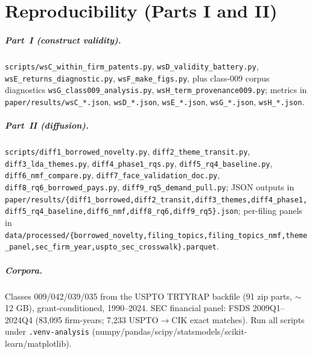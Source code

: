 \documentclass[11pt]{report}
\begin{document}
\chapter*{Reproducibility (Parts I and II)}

\paragraph{Part~I (construct validity).} \texttt{scripts/wsC\_within\_firm\_patents.py},
\texttt{wsD\_validity\_battery.py}, \texttt{wsE\_returns\_diagnostic.py},
\texttt{wsF\_make\_figs.py}, plus class-009 corpus diagnostics
\texttt{wsG\_class009\_analysis.py}, \texttt{wsH\_term\_provenance009.py};
metrics in \texttt{paper/results/wsC\_*.json}, \texttt{wsD\_*.json},
\texttt{wsE\_*.json}, \texttt{wsG\_*.json}, \texttt{wsH\_*.json}.

\paragraph{Part~II (diffusion).} \texttt{scripts/diff1\_borrowed\_novelty.py},
\texttt{diff2\_theme\_transit.py}, \texttt{diff3\_lda\_themes.py},
\texttt{diff4\_phase1\_rqs.py}, \texttt{diff5\_rq4\_baseline.py},
\texttt{diff6\_nmf\_compare.py}, \texttt{diff7\_face\_validation\_doc.py},
\texttt{diff8\_rq6\_borrowed\_pays.py}, \texttt{diff9\_rq5\_demand\_pull.py};
JSON outputs in
\texttt{paper/results/\{diff1\_borrowed,diff2\_transit,diff3\_themes,diff4\_phase1,diff5\_rq4\_baseline,diff6\_nmf,diff8\_rq6,diff9\_rq5\}.json};
per-filing panels in
\texttt{data/processed/\{borrowed\_novelty,filing\_topics,filing\_topics\_nmf,theme\_panel,sec\_firm\_year,uspto\_sec\_crosswalk\}.parquet}.

\paragraph{Corpora.} Classes 009/042/039/035 from the USPTO TRTYRAP backfile
(91 zip parts, $\sim$12 GB), grant-conditioned, 1990--2024. SEC financial
panel: FSDS 2009Q1--2024Q4 (83{,}095 firm-years; 7{,}233 USPTO$\to$CIK exact
matches). Run all scripts under \texttt{.venv-analysis}
(numpy/pandas/scipy/statsmodels/scikit-learn/matplotlib).
\end{document}
